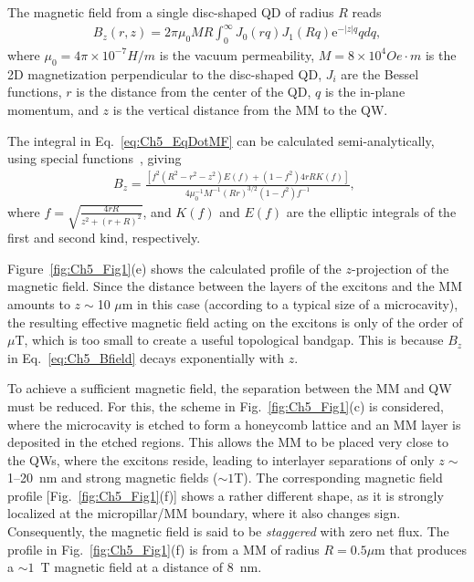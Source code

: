 The magnetic field from a single disc-shaped QD of radius $R$
reads~\cite{Erdin:2002aa,Lyuksyutov:2005aa}
%
\begin{eqnarray}\label{eq:Ch5_EqDotMF}
B_z(r,z)=2\pi \mu_0 M R\int_0^\infty J_0(rq)J_1(Rq)\mathrm{e}^{-|z|q}q dq,
\end{eqnarray}
%
where $\mu_0 = 4\pi\times10^{-7} H/m$ is the vacuum permeability, $M=8\times 10^4Oe\cdot m$ is the 2D magnetization perpendicular to the disc-shaped QD, $J_i$ are the Bessel functions, $r$ is the distance from the center of the QD, $q$ is the in-plane momentum, and $z$ is the vertical distance from the MM to the QW.

The integral in Eq.~\eqref{eq:Ch5_EqDotMF} can be calculated semi-analytically, using special functions~\cite{A.-P.-Prudnikov:2003aa}, giving%
\begin{eqnarray}
B_z=\frac{\left[
f^2(R^2-r^2-z^2)E(f)
+(1-f^2)4rRK(f)
\right]}{4\mu_0^{-1}M^{-1} (Rr)^{3/2}(1-f^2)f^{-1}},~~ \label{eq:Ch5_Bfield}
\end{eqnarray}
%
where $f=\sqrt{\frac{4rR}{z^2+(r+R)^2}}$, and $K(f)$ and $E(f)$ are the elliptic integrals of the first and second kind, respectively.

Figure~\ref{fig:Ch5_Fig1}(e) shows the calculated profile of the $z$-projection of the magnetic field.
Since the distance between the layers of the excitons and the MM amounts to $z\sim$10 $\mu$m in this case (according to a typical size of a microcavity), the resulting effective magnetic field acting on the excitons is only of the order of $\mu$T, which is too small to create a useful topological bandgap. This is because $B_z$ in Eq.~\eqref{eq:Ch5_Bfield} decays exponentially with $z$.

To achieve a sufficient magnetic field, the separation between the MM and QW must be reduced.
For this, the scheme in Fig.~\ref{fig:Ch5_Fig1}(c) is considered, where the microcavity is etched to form a honeycomb lattice and an MM layer is deposited in the etched regions.
This allows the MM to be placed very close to the QWs, where the excitons reside, leading to interlayer separations of only $z \sim $1--20~nm and strong magnetic fields ($\sim 1$T).
The corresponding magnetic field profile [Fig.~\ref{fig:Ch5_Fig1}(f)] shows a rather different shape, as it is strongly localized at the micropillar/MM boundary, where it also changes sign.
Consequently, the magnetic field is said to be \emph{staggered} with zero net flux.
The profile in Fig.~\ref{fig:Ch5_Fig1}(f) is from a MM of radius $R=0.5\mu$m that produces a $\sim 1$~T magnetic field at a distance of 8~nm.

